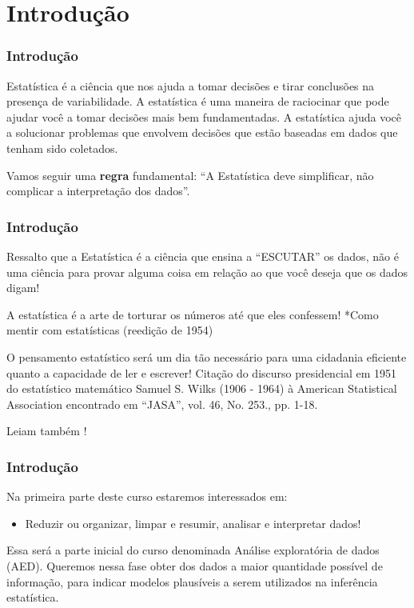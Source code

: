 \documentclass[12pt]{beamer}
\begin{document}
\section{Introdução}
\begin{frame}{}
\frametitle{Introdução}
\begin{block}{}
\justifying
Estatística é a ciência que nos ajuda a tomar decisões e tirar conclusões na presença de variabilidade. A estatística é uma maneira de raciocinar que pode ajudar você a tomar decisões mais bem fundamentadas. A estatística ajuda você a solucionar problemas que envolvem decisões que estão baseadas em dados que tenham sido coletados.
\end{block}
\pause
\begin{block}{}
\justifying
Vamos seguir uma \textbf{regra} fundamental:
``A Estatística deve simplificar, não complicar a interpretação dos dados''.
\end{block}
\end{frame}

\begin{frame}{}
\frametitle{Introdução}
\begin{block}{}
\justifying
Ressalto que a Estatística é a ciência que ensina a ``ESCUTAR'' os dados, não é uma ciência para provar alguma coisa em relação ao que você deseja que os dados digam!
\end{block}
\pause
\begin{block}{}
\justifying
A estatística é a arte de torturar os números até que eles confessem!
*Como mentir com estatísticas \cite{huff2016mentir} (reedição de 1954)
\end{block}
\pause
\begin{block}{}
\justifying
O pensamento estatístico será um dia tão necessário para uma cidadania eficiente quanto a capacidade de ler e escrever! Citação do discurso presidencial em 1951 do estatístico matemático Samuel S. Wilks (1906 - 1964) à American Statistical Association encontrado em ``JASA'', vol. 46, No. 253., pp. 1-18. 
\end{block}
\pause
\begin{block}{}
\justifying
Leiam também \citet{super16}!
\end{block}
\end{frame}

\begin{frame}{}
\frametitle{Introdução}
\begin{block}{}
\justifying
Na primeira parte deste curso estaremos interessados em:
\begin{itemize}
\item Reduzir ou organizar, limpar e resumir, analisar e interpretar dados!
\end{itemize}
\end{block}
\pause
\begin{block}{}
\justifying
Essa será a parte inicial do curso denominada Análise exploratória de dados (AED). Queremos nessa fase obter dos dados a maior
quantidade possível de informação, para indicar modelos plausíveis a serem utilizados
na inferência estatística.
\end{block}
\end{frame}
\end{document}
